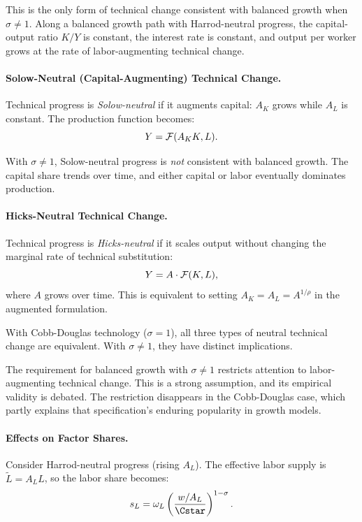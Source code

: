 This is the only form of technical change consistent with balanced growth when $\sigma \neq 1$. Along a balanced growth path with Harrod-neutral progress, the capital-output ratio $K/Y$ is constant, the interest rate is constant, and output per worker grows at the rate of labor-augmenting technical change.

\paragraph{Solow-Neutral (Capital-Augmenting) Technical Change.}
Technical progress is \emph{Solow-neutral} if it augments capital: $A_K$ grows while $A_L$ is constant. The production function becomes:
\begin{equation}
Y = \mathcal{F}(A_K K, L).
\label{eq:solow-neutral}
\end{equation}

With $\sigma \neq 1$, Solow-neutral progress is \emph{not} consistent with balanced growth. The capital share trends over time, and either capital or labor eventually dominates production.

\paragraph{Hicks-Neutral Technical Change.}
Technical progress is \emph{Hicks-neutral} if it scales output without changing the marginal rate of technical substitution:
\begin{equation}
Y = A \cdot \mathcal{F}(K, L),
\label{eq:hicks-neutral}
\end{equation}
where $A$ grows over time. This is equivalent to setting $A_K = A_L = A^{1/\rho}$ in the augmented formulation.

With Cobb-Douglas technology ($\sigma = 1$), all three types of neutral technical change are equivalent. With $\sigma \neq 1$, they have distinct implications.

\begin{calloutimportant}
The requirement for balanced growth with $\sigma \neq 1$ restricts attention to labor-augmenting technical change. This is a strong assumption, and its empirical validity is debated. The restriction disappears in the Cobb-Douglas case, which partly explains that specification's enduring popularity in growth models.
\end{calloutimportant}

\paragraph{Effects on Factor Shares.}
Consider Harrod-neutral progress (rising $A_L$). The effective labor supply is $\tilde{L} = A_L L$, so the labor share becomes:
\begin{equation}
s_L = \omega_L \left( \frac{w/A_L}{\Cstar} \right)^{1-\sigma}.
\label{eq:share-harrod}
\end{equation}

